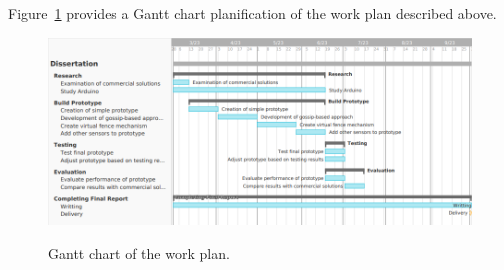 Figure~\ref{fig:gantt_charts} provides a Gantt chart planification of the work plan described above.
\begin{figure}[H]
      \caption{Gantt chart of the work plan.}
      \centering
      \includegraphics[scale=.8]{Chapters/Figures/gantt_chart.png}
      \label{fig:gantt_charts}
\end{figure}